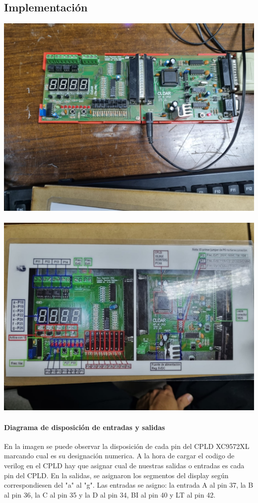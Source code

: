 \subsection{Implementación}
\includegraphics[width=14cm]{./imagenes/cpld.jpeg}
\paragraph{}
\includegraphics[width=14cm]{./imagenes/diag.jpeg}
\paragraph{Diagrama de disposición de entradas y salidas} En la imagen se puede observar la disposición de cada pin del CPLD XC9572XL marcando cual es su designación numerica. A la hora de cargar el codigo de verilog en el CPLD hay que asignar cual de nuestras salidas o entradas es cada pin del CPLD. En la salidas, se asignaron los segmentos del display según correspondiesen del "a" al "g". Las entradas se asigno: la entrada A al pin 37, la B al pin 36, la C al pin 35 y la D al pin 34, BI al pin 40 y LT al pin 42.
